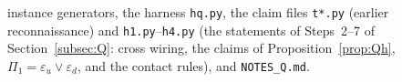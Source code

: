 \documentclass[11pt]{amsart}
\theoremstyle{definition}
\begin{document}
instance generators, the harness \texttt{hq.py}, the claim files \texttt{t*.py} (earlier reconnaissance) and \texttt{h1.py}--\texttt{h4.py} (the statements of Steps~2--7 of Section~\ref{subsec:Q}: cross wiring, the claims of Proposition~\ref{prop:Qh}, $\Pi_1=\varepsilon_u\vee\varepsilon_d$, and the contact rules), and \texttt{NOTES\_Q.md}.
\end{document}

